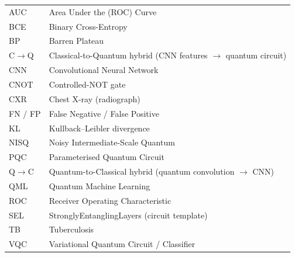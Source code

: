 \documentclass{mnnit}
\newcommand{\cq}{C$\rightarrow$Q}
\newcommand{\qc}{Q$\rightarrow$C}
\begin{document}
\begin{tabular}{@{}ll@{}}
AUC & Area Under the (ROC) Curve \\
BCE & Binary Cross-Entropy \\
BP & Barren Plateau \\
\cq & Classical-to-Quantum hybrid (CNN features $\rightarrow$ quantum circuit) \\
CNN & Convolutional Neural Network \\
CNOT & Controlled-NOT gate \\
CXR & Chest X-ray (radiograph) \\
FN / FP & False Negative / False Positive \\
KL & Kullback--Leibler divergence \\
NISQ & Noisy Intermediate-Scale Quantum \\
PQC & Parameterised Quantum Circuit \\
\qc & Quantum-to-Classical hybrid (quantum convolution $\rightarrow$ CNN) \\
QML & Quantum Machine Learning \\
ROC & Receiver Operating Characteristic \\
SEL & StronglyEntanglingLayers (circuit template) \\
TB & Tuberculosis \\
VQC & Variational Quantum Circuit / Classifier \\
\end{tabular}

\afterpreface







\appendix



{\renewcommand{\baselinestretch}{1}\small
}
\end{document}
